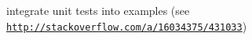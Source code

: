 
\begin{DoxyRefList}
\item[\label{todo__todo000001}%
\hypertarget{todo__todo000001}{}%
Class \hyperlink{classbeam_1_1_config_parser}{beam\+:\+:Config\+Parser} ]integrate unit tests into examples (see \href{http://stackoverflow.com/a/16034375/431033}{\tt http\+://stackoverflow.\+com/a/16034375/431033}) 
\end{DoxyRefList}